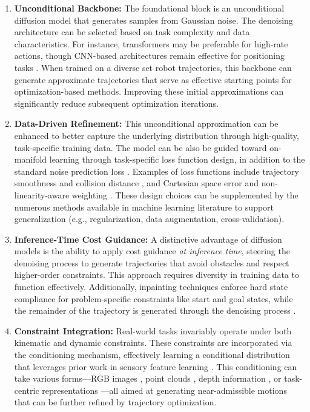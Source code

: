 \begin{enumerate}
    \item \textbf{\textcolor{customblack}{Unconditional Backbone}:} The foundational block is an unconditional diffusion model that generates samples from Gaussian noise. The denoising architecture can be selected based on task complexity and data characteristics. For instance, transformers may be preferable for high-rate actions, though CNN-based architectures remain effective for positioning tasks \cite{chi2023diffusion,seo2024presto,peebles2023scalable,carvalho2023motion,janner2022planning}. When trained on a diverse set robot trajectories, this backbone can generate approximate trajectories that serve as effective starting points for optimization-based methods. Improving these initial approximations can significantly reduce subsequent optimization iterations.
    
    \item \textbf{\textcolor{customgreen}{Data-Driven Refinement}:} This unconditional approximation can be enhanced to better capture the underlying distribution through high-quality, task-specific training data. The model can be also be guided toward on-manifold learning through task-specific loss function design, in addition to the standard noise prediction loss \cite{chi2023diffusion,saha2024edmp,carvalho2023motion}. Examples of loss functions include trajectory smoothness and collision distance \cite{seo2024presto}, and Cartesian space error and non-linearity-aware weighting \cite{huang2024diffusionseeder}. These design choices can be supplemented by the numerous methods available in machine learning literature to support generalization (e.g., regularization, data augmentation, cross-validation).
    
    \item \textbf{\textcolor{customaqua}{Inference-Time Cost Guidance}:} A distinctive advantage of diffusion models is the ability to apply cost guidance \textsl{at inference time}, steering the denoising process to generate trajectories that avoid obstacles and respect higher-order constraints. This approach requires diversity in training data to function effectively. Additionally, inpainting techniques enforce hard state compliance for problem-specific constraints like start and goal states, while the remainder of the trajectory is generated through the denoising process \cite{janner2022planning,saha2024edmp,carvalho2023motion}.
    
    \item \textbf{\textcolor{customred}{Constraint Integration}:} Real-world tasks invariably operate under both kinematic and dynamic constraints. These constraints are incorporated via the conditioning mechanism, effectively learning a conditional distribution that leverages prior work in sensory feature learning \cite{krizhevsky2012imagenet}. This conditioning can take various forms---RGB images \cite{chi2023diffusion,sridhar2024nomad}, point clouds \cite{ze20243d}, depth information \cite{huang2024diffusionseeder}, or task-centric representations \cite{seo2024presto}---all aimed at generating near-admissible motions that can be further refined by trajectory optimization.
\end{enumerate}


